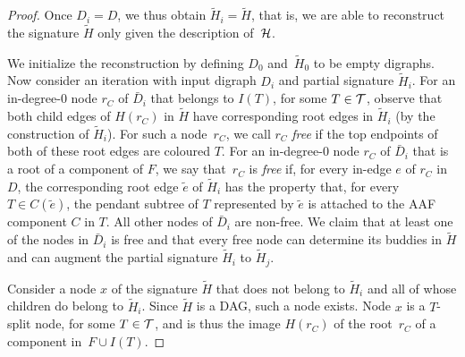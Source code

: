 \begin{proof}
  
  
  Once $D_i = D$, we thus obtain $\tilde H_i = \tilde H$, that is, we are able
  to reconstruct {the signature} $\tilde H$ only given the description of~$\mathcal{H}$.
  
We initialize the reconstruction by defining $D_0$ and~$\tilde H_0$ to be empty {digraphs}. Now consider an iteration with input {digraph} $D_i$ and {partial signature} $\tilde H_i$. 
  For an in-degree-$0$ node $r_C$ of $\bar D_i$ that belongs to $I(T)$, for some
  $T \in \mathcal{T}$, observe that both child edges of $H(r_C)$ in $\tilde H$ have corresponding root edges in $\tilde H_i$ (by the construction of $\tilde H_i$). For such a node~$r_C$, we call $r_C$ \emph{free} if the top endpoints of both of these root edges are coloured $T$.
  For an in-degree-$0$ node $r_C$ of $\bar D_i$ that is a root of {a component of} $F$, we say that~$r_C$ is \emph{free}
  if, for every in-edge $e$ of $r_C$ in $D$, the corresponding root edge $\tilde e$ of $\tilde H_i$ has the property that, for every
  $T \in C(\tilde e)$, the {pendant} subtree of $T$ represented by $\tilde e$ is {attached to the AAF component $C$ in $T$}. All other nodes of $\bar D_i$ are non-free.
  We claim that at least one of the nodes in $\bar D_i$ is free and that every
  free node can determine its buddies in $\tilde H$ and can augment {the partial signature} $\tilde H_i$
  to $\tilde H_j$.

  Consider a node $x$ of {the signature} $\tilde H$ that does not belong to $\tilde H_i$ and all of whose children {do} belong to $\tilde H_i$.
  Since $\tilde H$ is a DAG, such a node exists.
  Node $x$ is a $T$-split node, for some $T \in \mathcal{T}$, and is thus the image
  $H(r_C)$ of {the root~$r_C$ of a component} in~$F \cup I(T)$.
  

\end{proof}
